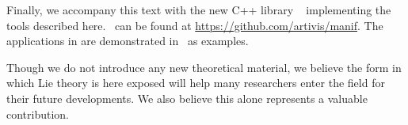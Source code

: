 Finally, we accompany this text with the new C++ library \manif\ \cite{DERAY-20-manif} implementing the tools described here. \manif\ can be found at \url{https://github.com/artivis/manif}.
The applications in  are demonstrated in \manif\ as examples.

Though we do not introduce any new theoretical material, we believe the form in which Lie theory is here exposed will help many researchers enter the field for their future developments.
We also believe this alone represents a valuable contribution.